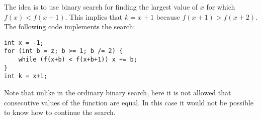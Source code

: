 The idea is to use binary search
for finding the largest value of $x$
for which $f(x)<f(x+1)$.
This implies that $k=x+1$
because $f(x+1)>f(x+2)$.
The following code implements the search: 

\begin{lstlisting}
int x = -1;
for (int b = z; b >= 1; b /= 2) {
    while (f(x+b) < f(x+b+1)) x += b;
}
int k = x+1;
\end{lstlisting}

Note that unlike in the ordinary binary search,
here it is not allowed that consecutive values
of the function are equal.
In this case it would not be possible to know
how to continue the search.
